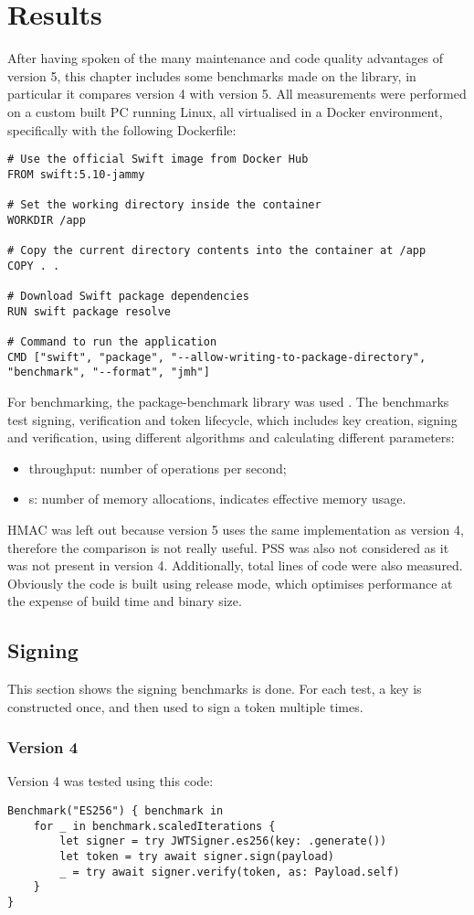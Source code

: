 \chapter{Results}
After having spoken of the many maintenance and code quality advantages of version 5, this chapter includes some benchmarks made on the library, in particular it compares version 4 with version 5. All measurements were performed on a custom built PC running Linux, all virtualised in a Docker environment, specifically with the following Dockerfile:
\begin{verbatim}
# Use the official Swift image from Docker Hub
FROM swift:5.10-jammy

# Set the working directory inside the container
WORKDIR /app

# Copy the current directory contents into the container at /app
COPY . .

# Download Swift package dependencies
RUN swift package resolve

# Command to run the application
CMD ["swift", "package", "--allow-writing-to-package-directory", "benchmark", "--format", "jmh"]
\end{verbatim}
For benchmarking, the package-benchmark library was used \cite{package-benchmark}. The benchmarks test signing, verification and token lifecycle, which includes key creation, signing and verification, using different algorithms and calculating different parameters:
\begin{itemize}
    \item throughput: number of operations per second;
    \item {}s: number of memory allocations, indicates effective memory usage.
\end{itemize}
HMAC was left out because version 5 uses the same implementation as version 4, therefore the comparison is not really useful. PSS was also not considered as it was not present in version 4. Additionally, total lines of code were also measured.
Obviously the code is built using release mode, which optimises performance at the expense of build time and binary size.


\section{Signing}
This section shows the signing benchmarks is done. For each test, a key is constructed once, and then used to sign a token multiple times.

\subsection*{Version 4}
Version 4 was tested using this code:
\begin{verbatim}
Benchmark("ES256") { benchmark in
    for _ in benchmark.scaledIterations {
        let signer = try JWTSigner.es256(key: .generate())
        let token = try await signer.sign(payload)
        _ = try await signer.verify(token, as: Payload.self)
    }
}
\end{verbatim}

